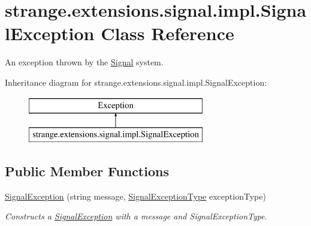 \hypertarget{classstrange_1_1extensions_1_1signal_1_1impl_1_1_signal_exception}{\section{strange.\-extensions.\-signal.\-impl.\-Signal\-Exception Class Reference}
\label{classstrange_1_1extensions_1_1signal_1_1impl_1_1_signal_exception}
}


An exception thrown by the \hyperlink{classstrange_1_1extensions_1_1signal_1_1impl_1_1_signal}{Signal} system.  


Inheritance diagram for strange.\-extensions.\-signal.\-impl.\-Signal\-Exception\-:\begin{figure}[H]
\begin{center}
\leavevmode
\includegraphics[height=2.000000cm]{classstrange_1_1extensions_1_1signal_1_1impl_1_1_signal_exception}
\end{center}
\end{figure}
\subsection*{Public Member Functions}
\begin{DoxyCompactItemize}
\item 
\hypertarget{classstrange_1_1extensions_1_1signal_1_1impl_1_1_signal_exception_a1797e5a7f814714a06d63b21c94a5943}{\hyperlink{classstrange_1_1extensions_1_1signal_1_1impl_1_1_signal_exception_a1797e5a7f814714a06d63b21c94a5943}{Signal\-Exception} (string message, \hyperlink{classstrange_1_1extensions_1_1signal_1_1api_1_1_signal_exception_type}{Signal\-Exception\-Type} exception\-Type)}\label{classstrange_1_1extensions_1_1signal_1_1impl_1_1_signal_exception_a1797e5a7f814714a06d63b21c94a5943}

\begin{DoxyCompactList}\small\item\em Constructs a \hyperlink{classstrange_1_1extensions_1_1signal_1_1impl_1_1_signal_exception}{Signal\-Exception} with a message and Signal\-Exception\-Type. \end{DoxyCompactList}\end{DoxyCompactItemize}
